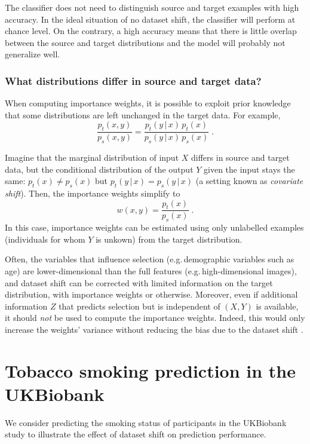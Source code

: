 \documentclass[a4paper,num-refs]{oup-contemporary}
\newcommand{\giv}{ \,|\, }
\newcommand{\eg}{e.g.\,}
\begin{document}
The classifier does not need to distinguish source and target examples with high
accuracy. In the ideal situation of no dataset shift, the classifier will
perform at chance level. On the contrary, a high accuracy means that there is
little overlap between the source and target distributions and the model
will probably not generalize well.

\subsubsection{What distributions differ in source and target data?}

When computing importance weights, it is possible to exploit prior knowledge that some distributions are left
unchanged in the target data.
%
For example,
\begin{equation}
  \frac{p_t(x, y)}{p_s(x, y)} = \frac{p_t(y \giv x)\,p_t(x)}{p_s(y \giv x)\,p_s(x)} \; .
\end{equation}
%


Imagine that the marginal distribution of input \(X\) differs in source and
target data, but the conditional distribution of the output \(Y\) given the input
stays the same: \(p_t(x) \neq p_s(x)\) but \(p_t(y \giv x) = p_s(y \giv x)\) (a
setting known as \emph{covariate shift}). Then, the importance weights
simplify to
\begin{equation}
  w(x, y) = \frac{p_t(x)}{p_s(x)} \; .
\end{equation}
%
In this case, importance weights can be estimated using only unlabelled examples
(individuals for whom \(Y\) is unkown) from the target distribution.
%

Often, the variables that influence selection (\eg demographic variables such as
age) are lower-dimensional than the full features (\eg high-dimensional images),
and dataset shift can be corrected with limited information on the target
distribution, with importance weights or otherwise.
%
Moreover, even if additional information \(Z\) that predicts
selection but is independent of \((X, Y)\) is available, it should \emph{not} be used to
compute the importance weights. Indeed, this would only increase the weights'
variance without reducing the bias due to the dataset shift \citep[Sec.
15.5]{hernan2020causal}.

\section{Tobacco smoking prediction in the UKBiobank}
\label{sec:ukb-experiment-details}
We consider predicting the smoking status of participants in the UKBiobank study to illustrate the effect of dataset shift on prediction performance.
\end{document}
